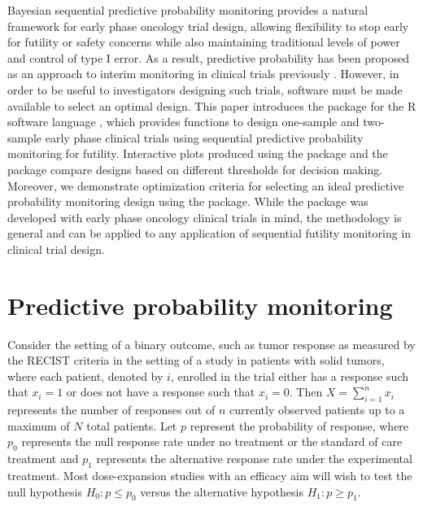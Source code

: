 Bayesian sequential predictive probability monitoring provides a natural
framework for early phase oncology trial design, allowing flexibility to
stop early for futility or safety concerns while also maintaining
traditional levels of power and control of type I error. As a result,
predictive probability has been proposed as an approach to interim
monitoring in clinical trials previously
\citep{Dmitrienko2006, Lee2008, Saville2014, Hobbs2018}. However, in
order to be useful to investigators designing such trials, software must
be made available to select an optimal design. This paper introduces the
 package for the R software language \citep{RCT2020},
which provides functions to design one-sample and two-sample early phase
clinical trials using sequential predictive probability monitoring for
futility. Interactive plots produced using the  package
\citep{Wickham2016} and the  package \citep{Sievert2020}
compare designs based on different thresholds for decision making.
Moreover, we demonstrate optimization criteria for selecting an ideal
predictive probability monitoring design using the 
package. While the  package was developed with early
phase oncology clinical trials in mind, the methodology is general and
can be applied to any application of sequential futility monitoring in
clinical trial design.

\hypertarget{predictive-probability-monitoring}{%
\section{Predictive probability
monitoring}\label{predictive-probability-monitoring}}

Consider the setting of a binary outcome, such as tumor response as
measured by the RECIST criteria in the setting of a study in patients
with solid tumors, where each patient, denoted by \(i\), enrolled in the
trial either has a response such that \(x_i = 1\) or does not have a
response such that \(x_i = 0\). Then \(X = \sum_{i=1}^n x_i\) represents
the number of responses out of \(n\) currently observed patients up to a
maximum of \(N\) total patients. Let \(p\) represent the probability of
response, where \(p_0\) represents the null response rate under no
treatment or the standard of care treatment and \(p_1\) represents the
alternative response rate under the experimental treatment. Most
dose-expansion studies with an efficacy aim will wish to test the null
hypothesis \(H_0: p \leq p_0\) versus the alternative hypothesis
\(H_1: p \geq p_1\).

